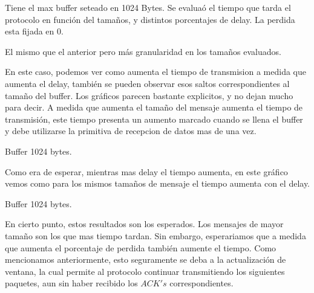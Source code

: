 Tiene el max buffer seteado en 1024 Bytes. Se evalua\'o el tiempo que tarda el protocolo en funci\'on del tama\~nos, y distintos porcentajes de delay. La perdida esta fijada en 0. 

El mismo que el anterior pero m\'as granularidad en los tama\~nos evaluados.

En este caso, podemos ver como aumenta el tiempo de transmision a medida que aumenta el delay, tambi\'en se pueden observar  esos saltos correspondientes al tama\~no del buffer. Los gr\'aficos parecen bastante explicitos, y no dejan mucho para decir. A medida que aumenta el tama\~no del mensaje aumenta el tiempo de transmisi\'on, este tiempo presenta un aumento marcado cuando se llena el buffer y debe utilizarse la primitiva de recepcion de datos mas de una vez.


Buffer 1024 bytes. 

Como era de esperar, mientras mas delay el tiempo aumenta, en este gr\'afico vemos como para los mismos tama\~nos de mensaje el tiempo aumenta con el delay. 


Buffer 1024 bytes.

En cierto punto, estos resultados son los esperados. Los mensajes de mayor tama\~no son los que mas tiempo tardan. Sin embargo, esperariamos que a medida que aumenta el porcentaje de perdida tambi\'en aumente el tiempo.
Como mencionamos anteriormente, esto seguramente se deba a la actualizaci\'on de ventana, la cual permite al protocolo continuar transmitiendo los siguientes paquetes, aun sin haber recibido los $ACK's$ correspondientes.